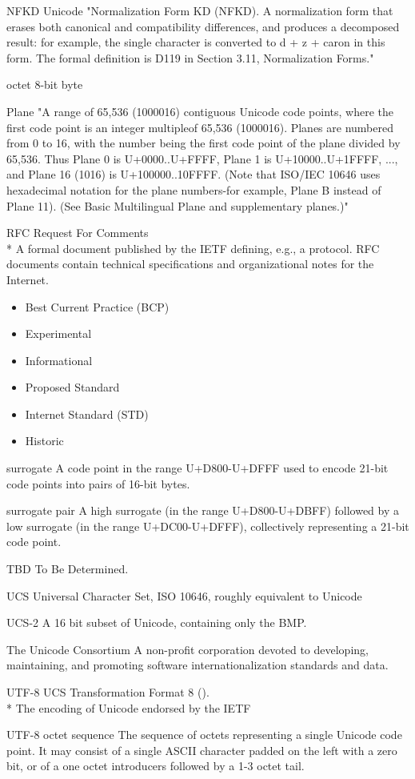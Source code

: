 \documentclass[b4paper]{article}
\begin{document}
\begin{definition}
\item [NFKD] Unicode
"Normalization Form KD (NFKD). A normalization form that erases both
canonical and compatibility differences, and produces a decomposed
result: for example, the single  character is converted to d + z +
caron in this form. The formal definition is D119 in Section 3.11,
Normalization Forms."

\item [octet] 8-bit byte
\item [Plane] "A range of 65,536 (1000016) contiguous Unicode code
points, where the first code point is an integer multipleof 65,536
(1000016). Planes are numbered from 0 to 16, with the number being the
first code point of the plane divided by 65,536. Thus Plane 0 is
U+0000..U+FFFF, Plane 1 is U+10000..U+1FFFF, ..., and Plane 16 (1016)
is U+100000..10FFFF. (Note that ISO/IEC 10646 uses hexadecimal
notation for the plane numbers-for example, Plane B instead of Plane
11). (See Basic Multilingual Plane and supplementary planes.)"
\item [RFC] Request For Comments
\\*
A formal document published by the IETF defining, e.g., a protocol.
RFC documents contain technical specifications and organizational notes for the Internet.
\begin{itemize}
  \item Best Current Practice (BCP)
  \item Experimental
  \item Informational
  \item Proposed Standard
  \item Internet Standard (STD)
  \item Historic
\end{itemize}
\item [surrogate] A code point in the range U+D800-U+DFFF used to
encode 21-bit code points into pairs of 16-bit bytes.
\item [surrogate pair] A high surrogate (in the range U+D800-U+DBFF)
followed by a low surrogate (in the range U+DC00-U+DFFF),
collectively representing a 21-bit code point.
\item [TBD] To Be Determined.
\item [UCS] Universal Character Set, ISO 10646, roughly equivalent to Unicode
\item [UCS-2] A 16 bit subset of Unicode, containing only the BMP.
\item [The Unicode Consortium] A non-profit corporation devoted to
developing, maintaining, and promoting software internationalization standards and data.
\item [UTF-8] UCS Transformation Format 8 (\cite{RFC 3629}).
\\*
The encoding of Unicode endorsed by the IETF
\item [UTF-8 octet sequence]
The sequence of octets representing a single Unicode code point.
It may consist of a single ASCII character padded on the left with a zero bit,
or of a one octet introducers followed by a 1-3 octet tail.


\end{definition}
\end{document}
